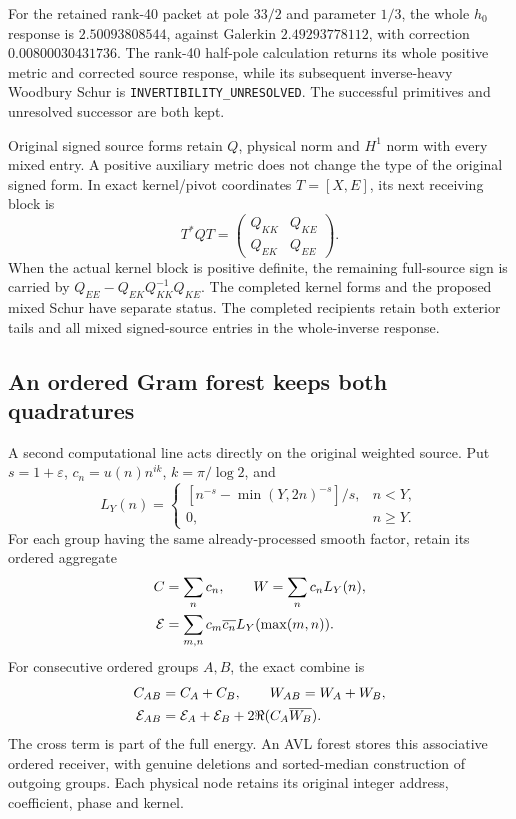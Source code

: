 For the retained rank-40 packet at pole \(33/2\) and parameter \(1/3\),
the whole \(h_0\) response is \(2.50093808544\), against Galerkin
\(2.49293778112\), with correction \(0.00800030431736\).
The rank-40 half-pole calculation returns its whole positive metric
and corrected source response, while its subsequent inverse-heavy
Woodbury Schur is \texttt{INVERTIBILITY\_UNRESOLVED}.
The successful primitives and unresolved successor are both kept.

Original signed source forms retain \(Q\), physical norm and \(H^1\)
norm with every mixed entry. A positive auxiliary metric does not
change the type of the original signed form. In exact kernel/pivot
coordinates \(T=[X,E]\), its next receiving block is
\[
 T^*QT=
 \begin{pmatrix}Q_{KK}&Q_{KE}\\Q_{EK}&Q_{EE}\end{pmatrix}.
\]
When the actual kernel block is positive definite, the remaining
full-source sign is carried by
\(Q_{EE}-Q_{EK}Q_{KK}^{-1}Q_{KE}\).
The completed kernel forms and the proposed mixed Schur have separate
status. The completed recipients retain both exterior tails and all mixed signed-source entries in the whole-inverse response.

\subsection{An ordered Gram forest keeps both quadratures}

A second computational line acts directly on the original weighted
source. Put \(s=1+\varepsilon\),
\(c_n=u(n)n^{ik}\), \(k=\pi/\log2\), and
\[
 L_Y(n)=
 \begin{cases}
 [n^{-s}-\min(Y,2n)^{-s}]/s,&n<Y,\\
 0,&n\geq Y.
 \end{cases}
\]
For each group having the same already-processed smooth factor,
retain its ordered aggregate
\[
\begin{aligned}
 C&=\sum_nc_n,\qquad W=\sum_nc_nL_Y(n),\\
 {\cal E}&=\sum_{m,n}c_m\overline{c_n}
                  L_Y(\max(m,n)).
\end{aligned}
\]
For consecutive ordered groups \(A,B\), the exact combine is
\[
\begin{aligned}
 C_{AB}&=C_A+C_B,\qquad W_{AB}=W_A+W_B,\\
 {\cal E}_{AB}&={\cal E}_A+{\cal E}_B
                    +2\Re(C_A\overline{W_B}).
\end{aligned}
\]
The cross term is part of the full energy. An AVL forest stores this
associative ordered receiver, with genuine deletions and sorted-median
construction of outgoing groups. Each physical node retains its
original integer address, coefficient, phase and kernel.

